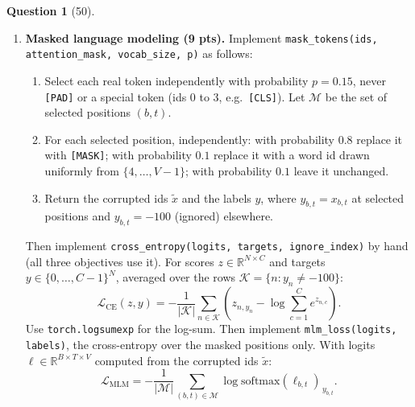 \documentclass[12pt]{article}
\theoremstyle{definition}
\newtheorem{exercise}{Question}%
\begin{document}
\begin{exercise}[50]
\begin{enumerate}
  Then implement \texttt{Encoder.forward(ids, attention\_mask, return\_logits)}: build
  the mask, embed the ids, apply the $L$ blocks in order to obtain $O$, then the MLM head. Thus, the score of word $w$ at position $t$ is
  \[
    \ell_{t,w} = o_t^\top E_w + c_w, \qquad \ell = O E^\top + c \in \mathbb{R}^{T \times V},
  \]
  where $c \in \mathbb{R}^V$ is a learned bias. A word gets a high score when the hidden vector is close to that
  word's embedding.

  \item \textbf{Masked language modeling (9 pts).} Implement \texttt{mask\_tokens(ids, attention\_mask, vocab\_size, p)} as follows:
  \begin{enumerate}
    \item Select each real token independently with probability $p = 0.15$, never \texttt{[PAD]} or a special token
          (ids 0 to 3, e.g.\ \texttt{[CLS]}). Let $\mathcal{M}$ be the set of selected positions $(b, t)$.
    \item For each selected position, independently: with probability $0.8$ replace it with \texttt{[MASK]}; with
          probability $0.1$ replace it with a word id drawn uniformly from $\{4, \dots, V-1\}$; with probability
          $0.1$ leave it unchanged.
    \item Return the corrupted ids $\tilde{x}$ and the labels $y$, where $y_{b,t} = x_{b,t}$ at selected positions
          and $y_{b,t} = -100$ (ignored) elsewhere.
  \end{enumerate}


  Then implement \texttt{cross\_entropy(logits, targets, ignore\_index)} by hand
  (all three objectives use it). For scores $z \in \mathbb{R}^{N \times C}$ and targets $y \in \{0, \dots, C-1\}^N$,
  averaged over the rows $\mathcal{K} = \{n : y_n \ne -100\}$:
  \[
    \mathcal{L}_{\text{CE}}(z, y) = -\frac{1}{|\mathcal{K}|} \sum_{n \in \mathcal{K}}
      \left( z_{n, y_n} - \log \sum_{c=1}^{C} e^{z_{n,c}} \right).
  \]
  Use \texttt{torch.logsumexp} for the log-sum. Then implement
  \texttt{mlm\_loss(logits, labels)}, the cross-entropy over the masked positions only. With logits
  $\ell \in \mathbb{R}^{B \times T \times V}$ computed from the corrupted ids $\tilde{x}$:
  \[
    \mathcal{L}_{\text{MLM}} = -\frac{1}{|\mathcal{M}|} \sum_{(b,t) \in \mathcal{M}}
      \log \mathrm{softmax}(\ell_{b,t})_{\,y_{b,t}}.
  \]


\end{enumerate}
\end{exercise}
\end{document}
